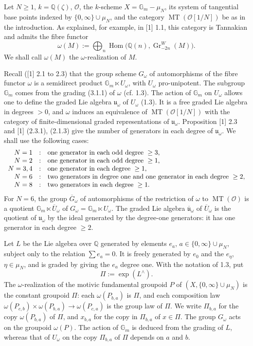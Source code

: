 \documentclass[10pt,a4paper]{article}
\newcommand{\Gm}{\mathbb G_m}
\newcommand{\muN}{\mu_N}
\newcommand{\Q}{\mathbb Q}
\newcommand{\Hom}{\operatorname{Hom}}
\newcommand{\MT}{\operatorname{MT}}
\newcommand{\Gr}{\operatorname{Gr}}
\newcommand{\OO}{\mathcal O}
\newcommand{\uomega}{\mathfrak u_\omega}
\newcommand{\barG}{\overline{G}_\omega}
\newcommand{\barU}{\overline{U}_\omega}
\newcommand{\baruomega}{\overline{\mathfrak u}_\omega}
\newcommand{\Lhat}{L^{\wedge}}
\theoremstyle{deligne}
\newcommand{\heading}[1]{\vspace{0.65em}\noindent{\bfseries #1}\quad}
\begin{document}
\heading{3.1.} Let \(N\ge1\), \(k=\Q(\zeta)\), \(\OO\), the \(k\)-scheme \(X=\Gm-\muN\), its system of tangential base points indexed by \(\{0,\infty\}\cup\muN\), and the category \(\MT(\OO[1/N])\) be as in the introduction. As explained, for example, in [1] 1.1, this category is Tannakian and admits the fibre functor
\[
\tag{3.1.1}
\omega(M):=\bigoplus_n\Hom\bigl(\Q(n),\Gr^W_{-2n}(M)\bigr).
\]
We shall call \(\omega(M)\) the \(\omega\)-realization of \(M\).

Recall ([1] 2.1 to 2.3) that the group scheme \(G_\omega\) of automorphisms of the fibre functor \(\omega\) is a semidirect product \(\Gm\ltimes U_\omega\), with \(U_\omega\) pro-unipotent. The subgroup \(\Gm\) comes from the grading (3.1.1) of \(\omega\) (cf. 1.3). The action of \(\Gm\) on \(U_\omega\) allows one to define the graded Lie algebra \(\uomega\) of \(U_\omega\) (1.3). It is a free graded Lie algebra in degrees \(>0\), and \(\omega\) induces an equivalence of \(\MT(\OO[1/N])\) with the category of finite-dimensional graded representations of \(\uomega\). Proposition [1] 2.3 and [1] (2.3.1), (2.1.3) give the number of generators in each degree of \(\uomega\). We shall use the following cases:
\[
\begin{array}{rcl}
N=1&:&\hbox{one generator in each odd degree }\ge3,\\
N=2&:&\hbox{one generator in each odd degree }\ge1,\\
N=3,4&:&\hbox{one generator in each degree }\ge1,\\
N=6&:&\hbox{two generators in degree one and one generator in each degree }\ge2,\\
N=8&:&\hbox{two generators in each degree }\ge1.
\end{array}
\]
For \(N=6\), the group \(\barG\) of automorphisms of the restriction of \(\omega\) to \(\MT(\OO)\) is a quotient \(\Gm\ltimes\barU\) of \(G_\omega=\Gm\ltimes U_\omega\). The graded Lie algebra \(\baruomega\) of \(\barU\) is the quotient of \(\uomega\) by the ideal generated by the degree-one generators: it has one generator in each degree \(\ge2\).

\heading{3.2.} Let \(L\) be the Lie algebra over \(\Q\) generated by elements \(e_a\), \(a\in\{0,\infty\}\cup\muN\), subject only to the relation \(\sum e_a=0\). It is freely generated by \(e_0\) and the \(e_\eta\), \(\eta\in\muN\), and is graded by giving the \(e_a\) degree one. With the notation of 1.3, put
\[
\Pi:=\exp(\Lhat).
\]
The \(\omega\)-realization of the motivic fundamental groupoid \(P\) of \((X,\{0,\infty\}\cup\muN)\) is the constant groupoid \(\Pi\): each \(\omega(P_{b,a})\) is \(\Pi\), and each composition law \(\omega(P_{c,b})\times\omega(P_{b,a})\to\omega(P_{c,a})\) is the group law of \(\Pi\). We write \(\Pi_{b,a}\) for the copy \(\omega(P_{b,a})\) of \(\Pi\), and \(x_{b,a}\) for the copy in \(\Pi_{b,a}\) of \(x\in\Pi\). The group \(G_\omega\) acts on the groupoid \(\omega(P)\). The action of \(\Gm\) is deduced from the grading of \(L\), whereas that of \(U_\omega\) on the copy \(\Pi_{b,a}\) of \(\Pi\) depends on \(a\) and \(b\).
\end{document}
